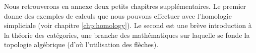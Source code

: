 Nous retrouverons en annexe deux petits chapitres supplémentaires. Le premier donne des exemples de calculs que nous pouvons effectuer avec l'homologie simpliciale (voir chapitre \ref{chp:homology}). Le second est une brève introduction à la théorie des catégories, une branche des mathématiques sur laquelle se fonde la topologie algébrique (d'où l'utilisation des flèches).